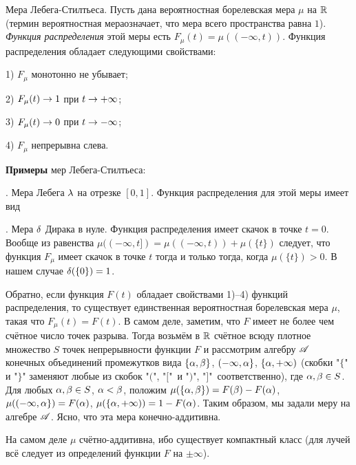 \documentclass[10pt]{article}
\begin{document}
\begin{ex}\label{Lebeg-Stilt'es}
Мера Лебега-Стилтьеса. Пусть дана вероятностная борелевская мера
$\mu$ на $\mathbb{R}$ (термин  вероятностная мера означает, что мера
всего пространства равна $1$). \emph{Функция распределения} этой
меры есть $F_{\mu}(t)=\mu((-\infty,t))$. Функция распределения
обладает следующими свойствами:

1) $F_{\mu}$ монотонно не убывает;

2) $F_{\mu}(t)\rightarrow 1$ при $t\rightarrow+\infty$;

3) $F_{\mu}(t)\rightarrow0$ при $t\rightarrow-\infty$;

4) $F_{\mu}$ непрерывна слева.
\end{ex}

\textbf{Примеры} мер Лебега-Стилтьеса:

. Мера Лебега $\lambda$ на отрезке $[0,1]$. Функция распределения
для этой меры имеет вид 

. Мера $\delta$ Дирака в нуле. Функция распределения
 имеет скачок в
точке $t=0$. Вообще из равенства
$\mu((-\infty,t])=\mu((-\infty,t))+\mu(\{t\})$ следует, что функция
$F_{\mu}$ имеет скачок в точке $t$ тогда и только тогда, когда
$\mu(\{t\})>0$. В нашем случае $\delta(\{0\})=1$.

Обратно, если функция $F(t)$ обладает свойствами 1)--4) функций
распределения, то существует единственная вероятностная борелевская
мера $\mu$, такая что $F_{\mu}(t)=F(t)$. В самом деле, заметим, что
$F$ имеет не более чем счётное число точек разрыва. Тогда возьмём в
$\mathbb{R}$ счётное всюду плотное множество $S$ точек непрерывности функции
$F$ и рассмотрим алгебру $\mathscr{A}$ конечных объединений промежутков вида
$\{\alpha,\beta\}$, $(-\infty,\alpha\}$, $\{\alpha,+\infty)$ (скобки "$\{$" и
"$\}$" заменяют любые из скобок "$($", "$[$" \,и "$)$", "$]$"\,
соответственно), где $\alpha,\beta\in S$. Для любых $\alpha,\beta\in S$,
$\alpha<\beta$, положим $\mu(\{\al,\be\})\bw =F(\be)-F(\al)$,
$\mu((-\infty,\alpha\})=F(\alpha)$, $\mu(\{\alpha,+\infty))=1-F(\alpha)$. Таким
образом, мы задали меру на алгебре $\mathscr{A}$. Ясно, что эта мера
конечно-аддитивна.

\begin{note}
На самом деле $\mu$ счётно-аддитивна, ибо существует компактный
класс (для лучей всё следует из определений функции $F$ на
$\pm\infty$).
\end{note}
\end{document}
